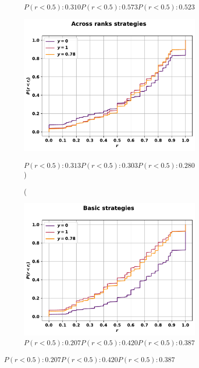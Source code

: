 \begin{figure}[!htbp]
\begin{subfigure}{.45\textwidth}
    \caption{\(P(r<0.5): 0.310 P(r<0.5): 0.573 P(r<0.5): 0.523\)}
    \end{subfigure}
    \begin{subfigure}{.45\textwidth}
    \includegraphics[width=\textwidth]{src/chapters/07/img/cfd_to_sequence_across_ranks_strategies.pdf}
    \caption(\(P(r<0.5): 0.313 P(r<0.5): 0.303 P(r<0.5): 0.280\))
    \end{subfigure}\hfill
    \begin{subfigure}{.45\textwidth}
    \includegraphics[width=\textwidth]{src/chapters/07/img/cfd_to_sequence_basic_strategies.pdf}
    \caption{\(P(r<0.5): 0.207 P(r<0.5): 0.420 P(r<0.5): 0.387\)}
    \end{subfigure}
\end{figure}


